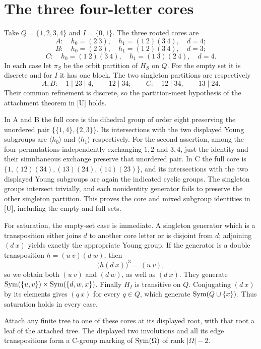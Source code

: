 \section{The three four-letter cores}
Take $Q=\{1,2,3,4\}$ and $I=\{0,1\}$. The three rooted cores are
\[
 A:\quad h_0=(2\ 3),\quad h_1=(1\ 2)(3\ 4),\quad d=4;
\]
\[
 B:\quad h_0=(2\ 3),\quad h_1=(1\ 2)(3\ 4),\quad d=3;
\]
\[
 C:\quad h_0=(1\ 2)(3\ 4),\quad h_1=(1\ 3)(2\ 4),\quad d=4.
\]
In each case let $\pi_S$ be the orbit partition of $H_S$ on $Q$.
For the empty set it is discrete and for $I$ it has one block.
The two singleton partitions are respectively
\[
 A,B:\quad 1\mid23\mid4,\qquad12\mid34;
 \qquad
 C:\quad12\mid34,\qquad13\mid24.
\]
Their common refinement is discrete, so the partition-meet hypothesis
of the attachment theorem in [U] holds.

In A and B the full core is the dihedral group of order eight preserving
the unordered pair $\{\{1,4\},\{2,3\}\}$.
Its intersections with the two displayed Young subgroups are
$\langle h_0\rangle$ and $\langle h_1\rangle$ respectively.
For the second assertion, among the four permutations independently
exchanging $1,2$ and $3,4$, just the identity and their simultaneous
exchange preserve that unordered pair. In C the full core is
$\{1,(12)(34),(13)(24),(14)(23)\}$, and its intersections with
the two displayed Young subgroups are again the indicated cyclic groups.
The singleton groups intersect trivially, and each nonidentity generator
fails to preserve the other singleton partition. This proves the core and mixed subgroup identities in [U], including
the empty and full sets.

For saturation, the empty-set case is immediate. A singleton generator
which is a transposition either joins $d$ to another core letter or is
disjoint from $d$; adjoining $(d\ x)$ yields exactly the appropriate
Young group. If the generator is a double transposition
$h=(u\ v)(d\ w)$, then
\[
 \bigl(h(d\ x)\bigr)^3=(u\ v),
\]
so we obtain both $(u\ v)$ and $(d\ w)$, as well as $(d\ x)$.
They generate $\operatorname{Sym}(\{u,v\})\times\operatorname{Sym}(\{d,w,x\})$.
Finally $H_I$ is transitive on $Q$. Conjugating $(d\ x)$ by its
elements gives $(q\ x)$ for every $q\in Q$, which generate
$\operatorname{Sym}(Q\cup\{x\})$. Thus saturation holds in every case.

\begin{corollary}
Attach any finite tree to one of these cores at its displayed root,
with that root a leaf of the attached tree. The displayed two
involutions and all its edge transpositions form a C-group marking
of $\operatorname{Sym}(\Omega)$ of rank $|\Omega|-2$.
\end{corollary}

